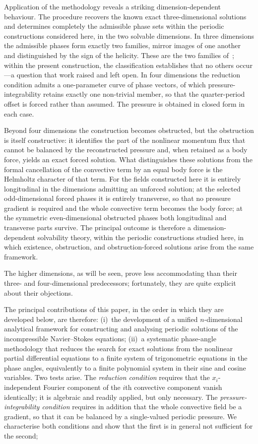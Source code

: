 \documentclass[11pt]{jfm}
\numberwithin{equation}{section}
\begin{document}
Application of the methodology reveals a striking dimension-dependent behaviour. The procedure
recovers the known exact three-dimensional solutions and determines completely the admissible phase
sets within the periodic constructions considered here, in the two solvable dimensions. In three
dimensions the admissible phases form exactly two families, mirror images of one another and
distinguished by the sign of the helicity. These are the two families of~\citet{ant}; within the
present construction, the classification establishes that no others occur---a question that work
raised and left open. In four dimensions the reduction condition admits a one-parameter curve of
phase vectors, of which pressure-integrability retains exactly one non-trivial member, so that the
quarter-period offset is forced rather than assumed. The pressure is obtained in closed form in
each case.

Beyond four dimensions the construction becomes obstructed, but the obstruction is itself
constructive: it identifies the part of the nonlinear momentum flux that cannot be balanced by the
reconstructed pressure and, when retained as a body force, yields an exact forced solution. What
distinguishes these solutions from the formal cancellation of the convective term by an equal body
force is the Helmholtz character of that term. For the fields constructed here it is entirely
longitudinal in the dimensions admitting an unforced solution; at the selected odd-dimensional
forced phases it is entirely transverse, so that no pressure gradient is required and the whole
convective term becomes the body force; at the symmetric even-dimensional obstructed phases both
longitudinal and transverse parts survive. The principal outcome is therefore a dimension-dependent
solvability theory, within the periodic constructions studied here, in which existence,
obstruction, and obstruction-forced solutions arise from the same framework.

The higher dimensions, as will be seen, prove less accommodating than their
three- and four-dimensional predecessors; fortunately, they are quite explicit
about their objections.

The principal contributions of this paper, in the order in which they are developed below, are
therefore:
(i)~the development of a unified $n$-dimensional analytical framework for constructing and
analysing periodic solutions of the incompressible Navier--Stokes
equations;
(ii)~a systematic phase-angle methodology that reduces the search for exact
solutions from the nonlinear partial differential equations to a finite system of
trigonometric equations in the phase angles, equivalently to a finite polynomial
system in their sine and cosine variables. Two tests arise. The \emph{reduction
condition} requires that the $x_i$-independent Fourier component of the $i$th
convective component vanish identically; it is algebraic and readily applied, but
only necessary. The \emph{pressure-integrability condition} requires in addition
that the whole convective field be a gradient, so that it can be balanced by a
single-valued periodic pressure. We characterise both conditions and show that the
first is in general not sufficient for the second;
\end{document}
